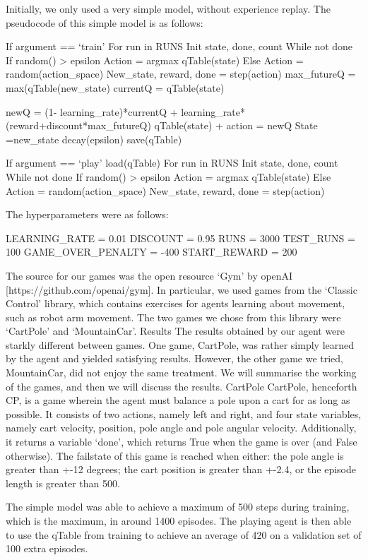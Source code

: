 \documentclass[a4paper]{article}
\begin{document}
Initially, we only used a very simple model, without experience replay. The pseudocode of this simple model is as follows:

\begin{algorithm}
If argument == ‘train’
For run in RUNS
		Init state, done, count
	While not done
			If random() > epsilon
				Action = argmax qTable(state)
		Else
				Action = random(action_space)
	New_state, reward, done = step(action)
	max_futureQ = max(qTable(new_state)
		currentQ = qTable(state)

newQ = (1- learning_rate)*currentQ + learning_rate*(reward+discount*max_futureQ)
qTable(state) + action = newQ
State =new_state
decay(epsilon)
save(qTable)

If argument == ‘play’
load(qTable)
For run in RUNS
		Init state, done, count
		While not done
			If random() > epsilon
				Action = argmax qTable(state)
			Else
			Action = random(action_space)
		New_state, reward, done = step(action)
\end{algorithm}

The hyperparameters were as follows:

LEARNING_RATE = 0.01
DISCOUNT = 0.95
RUNS = 3000
TEST_RUNS = 100
GAME_OVER_PENALTY = -400
START_REWARD = 200

The source for our games was the open resource `Gym’ by openAI [https://github.com/openai/gym]. In particular, we used games from the `Classic Control’ library, which contains exercises for agents learning about movement, such as robot arm movement. The two games we chose from this library were `CartPole’ and `MountainCar’.
Results
The results obtained by our agent were starkly different between games. One game, CartPole, was rather simply learned by the agent and yielded satisfying results. However, the other game we tried, MountainCar, did not enjoy the same treatment. We will summarise the working of the games, and then we will discuss the results.
CartPole
CartPole, henceforth CP, is a game wherein the agent must balance a pole upon a cart for as long as possible. It consists of two actions, namely left and right, and four state variables, namely cart velocity, position, pole angle and pole angular velocity. Additionally, it returns a variable `done’, which returns True when the game is over (and False otherwise). The failstate of this game is reached when either: the pole angle is greater than +-12 degrees; the cart position is greater than +-2.4, or the episode length is greater than 500.

The simple model was able to achieve a maximum of 500 steps during training, which is the maximum, in around 1400 episodes. The playing agent is then able to use the qTable from training to achieve an average of 420 on a validation set of 100 extra episodes.
\end{document}
